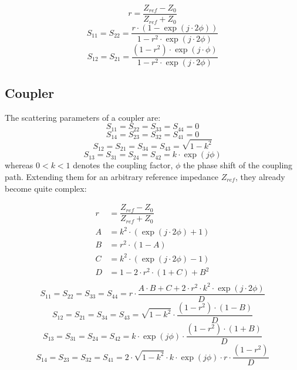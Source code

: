 \begin{equation}
r = \frac{Z_{ref}-Z_0}{Z_{ref}+Z_0}
\end{equation}
\begin{equation}
S_{11} = S_{22} = \frac{r\cdot\left(1-\exp\left(j\cdot 2\phi\right)\right)}{1-r^2\cdot\exp\left(j\cdot 2\phi\right)}
\end{equation}
\begin{equation}
S_{12} = S_{21} = \frac{(1-r^2)\cdot\exp\left(j\cdot\phi\right)}{1-r^2\cdot\exp\left(j\cdot 2\phi\right)}
\end{equation}

\subsection{Coupler}

The scattering parameters of a coupler are:
\begin{equation}
S_{11} = S_{22} = S_{33} = S_{44} = 0
\end{equation}
\begin{equation}
S_{14} = S_{23} = S_{32} = S_{41} = 0
\end{equation}
\begin{equation}
S_{12} = S_{21} = S_{34} = S_{43} = \sqrt{1-k^2}
\end{equation}
\begin{equation}
S_{13} = S_{31} = S_{24} = S_{42} = k\cdot \exp\left(j\phi\right)
\end{equation}
whereas $0<k<1$ denotes the coupling factor, $\phi$ the phase shift of
the coupling path.  Extending them for an arbitrary reference
impedance $Z_{ref}$, they already become quite complex:

\begin{align}
r &= \dfrac{Z_{ref}-Z_0}{Z_{ref}+Z_0} \\
A &= k^2 \cdot \left( \exp\left(j\cdot 2\phi\right)+1 \right) \\
B &= r^2 \cdot \left(1-A\right) \\
C &= k^2 \cdot \left( \exp\left(j\cdot 2\phi\right)-1 \right) \\
D &= 1 - 2\cdot r^2\cdot \left(1+C\right) + B^2 \\
\end{align}
\begin{equation}
S_{11} = S_{22} = S_{33} = S_{44} = r\cdot\dfrac{A\cdot B + C + 2\cdot r^2\cdot k^2\cdot\exp\left(j\cdot 2\phi\right)}{D}
\end{equation}
\begin{equation}
S_{12} = S_{21} = S_{34} = S_{43} = \sqrt{1-k^2}\cdot \dfrac{\left(1-r^2\right)\cdot \left(1-B\right)}{D}
\end{equation}
\begin{equation}
S_{13} = S_{31} = S_{24} = S_{42} = k\cdot\exp\left(j\phi\right)\cdot \dfrac{\left(1-r^2\right)\cdot \left(1+B\right)}{D}
\end{equation}
\begin{equation}
S_{14} = S_{23} = S_{32} = S_{41} = 2\cdot\sqrt{1-k^2}\cdot k\cdot\exp\left(j\phi\right)\cdot r\cdot \dfrac{\left(1-r^2\right)}{D}
\end{equation}

